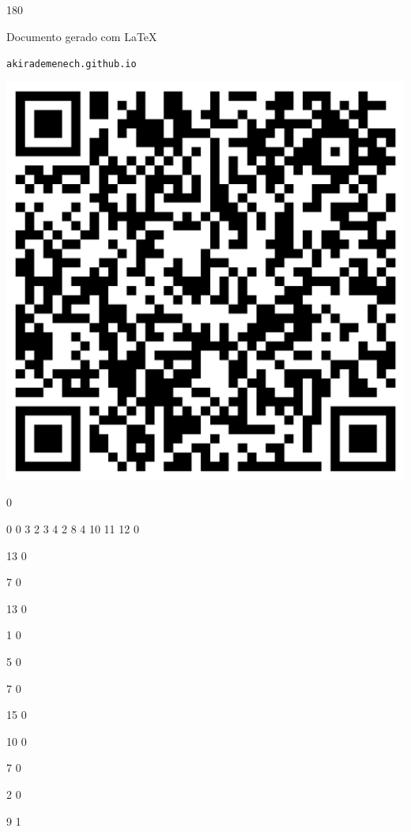 \documentclass[12pt]{article}
\begin{document}
	\begin{turn}{180}	
		\begin{minipage}{\textwidth}		  
		  Documento gerado com \LaTeX			
		  
		  \texttt{akirademenech.github.io}

		  \includegraphics[height=0.3\textheight]{2e-2.pdf}

		\end{minipage}	
	\end{turn}  
		  
		\vfill  
		  
{
	0	%

	0	%
	0	%
	3	%
	2	%
	3	%
	4	%
	2	%
	8	%
	4	%
	10	%
	11	%
	12	%
	0	%

	13	%
	0	%

	7	%
	0	%

	13	%
	0	%

	1	%
	0	%

	5	%
	0	%

	7	%
	0	%

	15	%
	0	%

	10	%
	0	%

	7	%
	0	%

	2	%
	0	%

	9	%
	1	%
}	  
		    	
\end{document}
